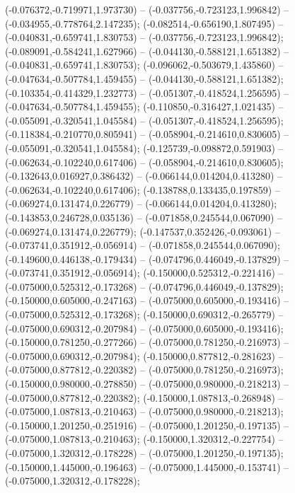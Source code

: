  (-0.076372,-0.719971,1.973730) -- (-0.037756,-0.723123,1.996842) -- (-0.034955,-0.778764,2.147235);
 (-0.082514,-0.656190,1.807495) -- (-0.040831,-0.659741,1.830753) -- (-0.037756,-0.723123,1.996842);
 (-0.089091,-0.584241,1.627966) -- (-0.044130,-0.588121,1.651382) -- (-0.040831,-0.659741,1.830753);
 (-0.096062,-0.503679,1.435860) -- (-0.047634,-0.507784,1.459455) -- (-0.044130,-0.588121,1.651382);
 (-0.103354,-0.414329,1.232773) -- (-0.051307,-0.418524,1.256595) -- (-0.047634,-0.507784,1.459455);
 (-0.110850,-0.316427,1.021435) -- (-0.055091,-0.320541,1.045584) -- (-0.051307,-0.418524,1.256595);
 (-0.118384,-0.210770,0.805941) -- (-0.058904,-0.214610,0.830605) -- (-0.055091,-0.320541,1.045584);
 (-0.125739,-0.098872,0.591903) -- (-0.062634,-0.102240,0.617406) -- (-0.058904,-0.214610,0.830605);
 (-0.132643,0.016927,0.386432) -- (-0.066144,0.014204,0.413280) -- (-0.062634,-0.102240,0.617406);
 (-0.138788,0.133435,0.197859) -- (-0.069274,0.131474,0.226779) -- (-0.066144,0.014204,0.413280);
 (-0.143853,0.246728,0.035136) -- (-0.071858,0.245544,0.067090) -- (-0.069274,0.131474,0.226779);
 (-0.147537,0.352426,-0.093061) -- (-0.073741,0.351912,-0.056914) -- (-0.071858,0.245544,0.067090);
 (-0.149600,0.446138,-0.179434) -- (-0.074796,0.446049,-0.137829) -- (-0.073741,0.351912,-0.056914);
 (-0.150000,0.525312,-0.221416) -- (-0.075000,0.525312,-0.173268) -- (-0.074796,0.446049,-0.137829);
 (-0.150000,0.605000,-0.247163) -- (-0.075000,0.605000,-0.193416) -- (-0.075000,0.525312,-0.173268);
 (-0.150000,0.690312,-0.265779) -- (-0.075000,0.690312,-0.207984) -- (-0.075000,0.605000,-0.193416);
 (-0.150000,0.781250,-0.277266) -- (-0.075000,0.781250,-0.216973) -- (-0.075000,0.690312,-0.207984);
 (-0.150000,0.877812,-0.281623) -- (-0.075000,0.877812,-0.220382) -- (-0.075000,0.781250,-0.216973);
 (-0.150000,0.980000,-0.278850) -- (-0.075000,0.980000,-0.218213) -- (-0.075000,0.877812,-0.220382);
 (-0.150000,1.087813,-0.268948) -- (-0.075000,1.087813,-0.210463) -- (-0.075000,0.980000,-0.218213);
 (-0.150000,1.201250,-0.251916) -- (-0.075000,1.201250,-0.197135) -- (-0.075000,1.087813,-0.210463);
 (-0.150000,1.320312,-0.227754) -- (-0.075000,1.320312,-0.178228) -- (-0.075000,1.201250,-0.197135);
 (-0.150000,1.445000,-0.196463) -- (-0.075000,1.445000,-0.153741) -- (-0.075000,1.320312,-0.178228);
